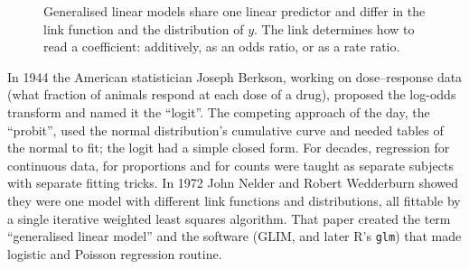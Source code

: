 \begin{figure}[H]
\centering
{}
\caption{Generalised linear models share one linear predictor and differ in the link
function and the distribution of $y$. The link determines how to read a coefficient:
additively, as an odds ratio, or as a rate ratio.}
\label{fig:glm-umbrella}
\end{figure}

\begin{historybox}
In 1944 the American statistician Joseph Berkson, working on dose--response data (what
fraction of animals respond at each dose of a drug), proposed the log-odds transform and
named it the ``logit''. The competing approach of the day, the ``probit'', used the normal
distribution's cumulative curve and needed tables of the normal to fit; the logit had a
simple closed form. For decades, regression for continuous data, for proportions and for
counts were taught as separate subjects with separate fitting tricks. In 1972 John Nelder
and Robert Wedderburn showed they were one model with different link functions and
distributions, all fittable by a single iterative weighted least squares algorithm. That
paper created the term ``generalised linear model'' and the software (GLIM, and later R's
\texttt{glm}) that made logistic and Poisson regression routine.
\end{historybox}

